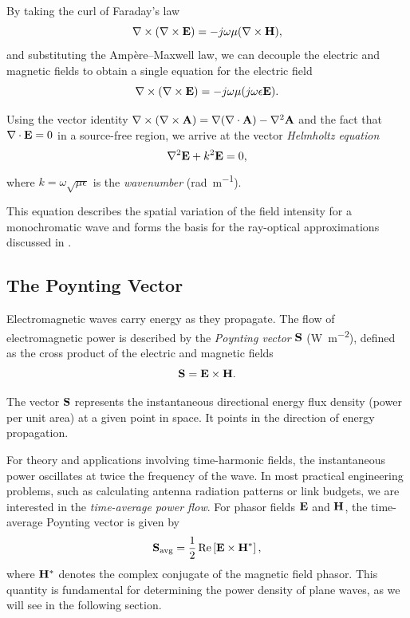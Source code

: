 By taking the curl of Faraday's law
\begin{equation}
  \nabla \times (\nabla \times \mathbf{E}) = -j\omega \mu (\nabla \times \mathbf{H}),
\end{equation}
and substituting the Ampère--Maxwell law, we can decouple the electric and magnetic fields to obtain a single equation for the electric field
\begin{equation}
  \nabla \times (\nabla \times \mathbf{E}) = -j\omega \mu (j\omega \epsilon \mathbf{E}).
\end{equation}

Using the vector identity $\nabla \times (\nabla \times \mathbf{A}) = \nabla(\nabla \cdot \mathbf{A}) - \nabla^2 \mathbf{A}$ and the fact that $\nabla \cdot \mathbf{E} = 0$ in a source-free region, we arrive at the vector \emph{Helmholtz equation}
\begin{equation}\label{eq:helmholtz}
  \nabla^2 \mathbf{E} + k^2 \mathbf{E} = 0,
\end{equation}
where $k = \omega \sqrt{\mu \epsilon}$ is the \emph{\gls{wavenumber}} (\unit{\radian\per\meter}).

This equation describes the spatial variation of the field intensity for a monochromatic wave and forms the basis for the ray-optical approximations discussed in .

\subsection{The Poynting Vector}

Electromagnetic waves carry energy as they propagate. The flow of electromagnetic power is described by the \emph{Poynting vector} $\mathbf{S}$ (\unit{\watt\per\meter\squared}), defined as the cross product of the electric and magnetic fields
\begin{equation}
  \mathbf{S} = \mathbf{E} \times \mathbf{H}.
\end{equation}

The vector $\mathbf{S}$ represents the instantaneous directional energy flux density (power per unit area) at a given point in space. It points in the direction of energy propagation.

For theory and applications involving time-harmonic fields, the instantaneous power oscillates at twice the frequency of the wave. In most practical engineering problems, such as calculating antenna radiation patterns or link budgets, we are interested in the \emph{time-average power flow}. For phasor fields $\mathbf{E}$ and $\mathbf{H}$, the time-average Poynting vector is given by
\begin{equation}
  \mathbf{S}_{\text{avg}} = \frac{1}{2} \operatorname{Re}\left[\mathbf{E} \times \mathbf{H}^*\right],
\end{equation}
where $\mathbf{H}^*$ denotes the complex conjugate of the magnetic field phasor. This quantity is fundamental for determining the power density of plane waves, as we will see in the following section.

